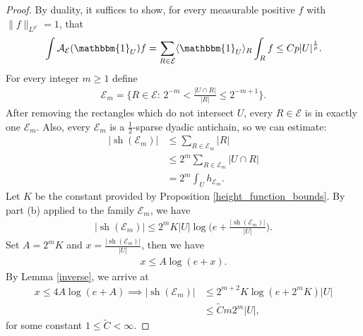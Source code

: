 \documentclass[10pt,a4paper]{amsart}
\newcommand{\ind}{\mathbbm{1}}
\newcommand{\sh}{\operatorname{sh}}
\begin{document}
\begin{proof}
  By duality, it suffices to show, for every measurable positive $f$ with
  $\|f\|_{L^{p'}} = 1$, that
  \begin{align*}
    \int \mathcal{A}_{\mathcal{E}}(\ind_U) f
    = \sum_{R \in \mathcal{E}} \langle \ind_U \rangle_R \int_R f
    \leq C p|U|^{\frac{1}{p}}.
  \end{align*}
  For every integer $m \geq 1$ define
  \begin{align*}
    \mathcal{E}_m = \bigg\{R \in \mathcal{E}:\,
    2^{-m} < \frac{|U \cap R|}{|R|} \leq 2^{-m+1} \bigg\}.
  \end{align*}
  After removing the rectangles which do not intersect $U$, every
  $R \in \mathcal{E}$ is in exactly one $\mathcal{E}_m$.
  Also, every $\mathcal{E}_m$ is a $\frac{1}{2}$-sparse dyadic antichain, so we
  can estimate:
  \begin{align*}
    |\sh(\mathcal{E}_m)| &\leq \sum_{R \in \mathcal{E}_m} |R| \\
    &\leq 2^m \sum_{R \in \mathcal{E}_m} |U \cap R| \\
    &= 2^m \int_U h_{\mathcal{E}_m}.
  \end{align*}
  Let $K$ be the constant provided by Proposition \ref{height_function_bounds}.
  By part (b) applied to the family $\mathcal{E}_m$, we have
  \begin{align*}
    |\sh(\mathcal{E}_m)| \leq 2^m  K |U|\log\bigg( e +
    \frac{|\sh(\mathcal{E}_m)|}{|U|} \bigg).
  \end{align*}
  Set $A = 2^m K$ and $x = \frac{|\sh(\mathcal{E}_m)|}{|U|}$, then we have
  \begin{align*}
    x \leq A\log(e+x).
  \end{align*}
  By Lemma \ref{inverse}, we arrive at
  \begin{align*}
    x \leq 4A \log(e+A) \implies |\sh(\mathcal{E}_m)|
    &\leq 2^{m+2}K \log(e + 2^m K)|U| \\
    &\leq \widetilde{C} m 2^m |U|,
  \end{align*}
  for some constant $1 \leq \widetilde{C} < \infty$.


\end{proof}
\end{document}
